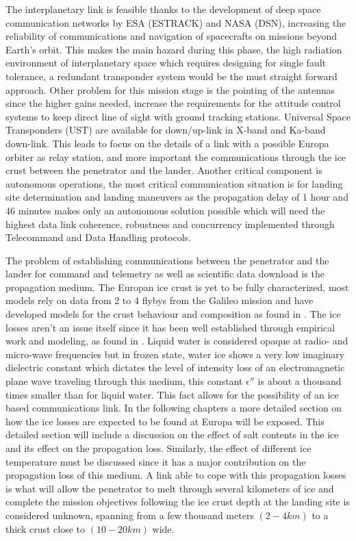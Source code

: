 The interplanetary link is feasible thanks to the development of deep space communication networks by ESA (ESTRACK) and NASA (DSN), increasing the reliability of communications and navigation of spacecrafts on missions beyond Earth's orbit. This makes the main hazard during this phase, the high radiation environment of interplanetary space which requires designing for single fault tolerance, a redundant transponder system would be the must straight forward approach. Other problem for this mission stage is the pointing of the antennas since the higher gains needed, increase the requirements for the attitude control systems to keep direct line of sight with ground tracking stations. Universal Space Transponders (UST) are available for down/up-link in X-band and Ka-band down-link. This leads to focus on the details of a link with a possible Europa orbiter as relay station, and more important the communications through the ice crust between the penetrator and the lander. Another critical component is autonomous operations, the most critical communication situation is for landing site determination and landing maneuvers as the propagation delay of 1 hour and 46 minutes makes only an autonomous solution possible which will need the highest data link coherence, robustness and concurrency implemented through Telecommand and Data Handling protocols.

The problem of establishing communications between the penetrator and the lander for command and telemetry as well as scientific data download is the propagation medium. The Europan ice crust is yet to be fully characterized, most models rely on data from 2 to 4 flybys from the Galileo mission and have developed models for the crust behaviour and composition as found in \cite{Chyba}. The ice losses aren't an issue itself since it has been well established through empirical work and modeling, as found in \cite{iceLink-scott}. Liquid water is considered opaque at radio- and micro-wave frequencies but in frozen state, water ice shows a very low imaginary dielectric constant which dictates the level of intensity loss of an electromagnetic plane wave traveling through this medium, this constant $\epsilon''$ is about a thousand times smaller than for liquid water. This fact allows for the possibility of an ice based communications link. In the following chapters a more detailed section on how the ice losses are expected to be found at Europa will be exposed. This detailed section will include a discussion on the effect of salt contents in the ice and its effect on the propagation loss. Similarly, the effect of different ice temperature must be discussed since it has a major contribution on the propagation loss of this medium. A link able to cope with this propagation losses is what will allow the penetrator to melt through several kilometers of ice and complete the mission objectives following the ice crust depth at the landing site is considered unknown, spanning from a few thousand meters $(2-4 km)$ to a thick crust close to $(10-20 km)$ wide.

